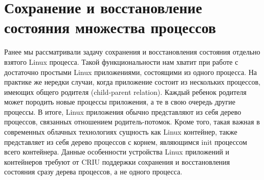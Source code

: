 \section{Сохранение и восстановление состояния множества процессов}
 
Ранее мы рассматривали задачу сохранения и восстановления состояния отдельно взятого Linux процесса. Такой функциональности нам хватит при работе с достаточно простыми Linux приложениями, состоящими из одного процесса. На практике же нередки случаи, когда приложение состоит из нескольких процессов, имеющих общего родителя (child-parent relation). Каждый ребенок родителя может породить новые процессы приложения, а те в свою очередь другие процессы. В итоге, Linux приложения обычно представляют из себя дерево процессов, связанных отношением родитель-потомок. Кроме того, такая важная в современных облачных технологиях сущность как Linux контейнер, также представляет из себя дерево процессов с корнем, являющимся init процессом всего контейнера. Данные особенности устройства Linux приложений и контейнеров требуют от CRIU поддержки сохранения и восстановления состояния сразу дерева процессов, а не одного процесса.
